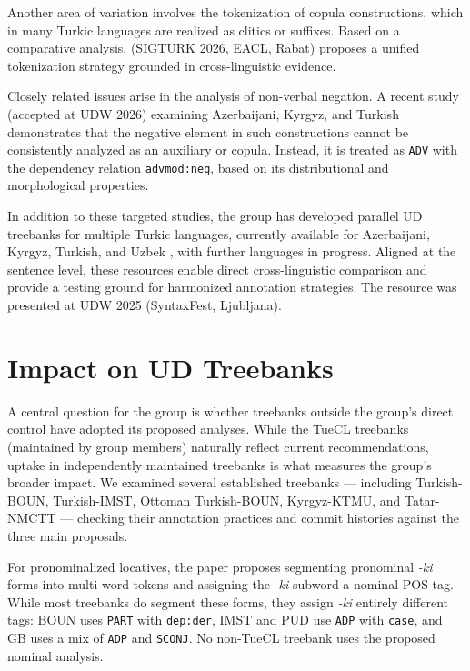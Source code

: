 \documentclass[11pt,a4paper]{article}
\begin{document}
Another area of variation involves the tokenization of copula constructions, which in many Turkic languages are realized as clitics or suffixes. Based on a comparative analysis, \citet{coltekinTokenisationTurkicCopula2026} (SIGTURK 2026, EACL, Rabat) proposes a unified tokenization strategy grounded in cross-linguistic evidence.

Closely related issues arise in the analysis of non-verbal negation. A recent study (accepted at UDW 2026) examining Azerbaijani, Kyrgyz, and Turkish demonstrates that the negative element in such constructions cannot be consistently analyzed as an auxiliary or copula. Instead, it is treated as \texttt{ADV} with the dependency relation \texttt{advmod:neg}, based on its distributional and morphological properties.

In addition to these targeted studies, the group has developed parallel UD treebanks for multiple Turkic languages, currently available for Azerbaijani, Kyrgyz, Turkish, and Uzbek \citep{akhundjanovaParallelUniversalDependencies2025}, with further languages in progress. Aligned at the sentence level, these resources enable direct cross-linguistic comparison and provide a testing ground for harmonized annotation strategies. The resource was presented at UDW 2025 (SyntaxFest, Ljubljana).

\section{Impact on UD Treebanks}

A central question for the group is whether treebanks outside the group's direct control have adopted its proposed analyses.
While the TueCL treebanks (maintained by group members) naturally reflect current recommendations, uptake in independently maintained treebanks is what measures the group's broader impact.
We examined several established treebanks --- including Turkish-BOUN, Turkish-IMST, Ottoman Turkish-BOUN, Kyrgyz-KTMU, and Tatar-NMCTT --- checking their annotation practices and commit histories against the three main proposals.

For pronominalized locatives, the paper proposes segmenting pronominal \textit{-ki} forms into multi-word tokens and assigning the \textit{-ki} subword a nominal POS tag.
While most treebanks do segment these forms, they assign \textit{-ki} entirely different tags: BOUN uses \texttt{PART} with \texttt{dep:der}, IMST and PUD use \texttt{ADP} with \texttt{case}, and GB uses a mix of \texttt{ADP} and \texttt{SCONJ}. No non-TueCL treebank uses the proposed nominal analysis.
\end{document}
